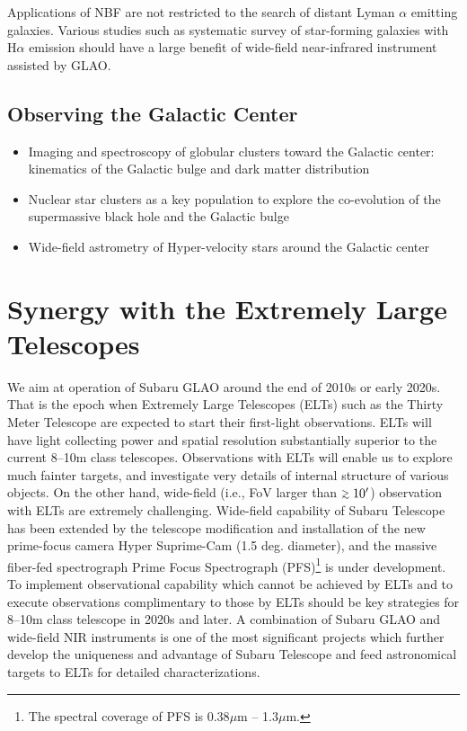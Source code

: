 Applications of NBF are not restricted to the search of distant Lyman
$\alpha$ emitting galaxies. Various studies such as systematic survey of
star-forming galaxies with H$\alpha$ emission should have a large
benefit of wide-field near-infrared instrument assisted by GLAO.


\subsection{Observing the Galactic Center}

\begin{itemize}
 \setlength{\itemsep}{-3pt}
 \item Imaging and spectroscopy of globular clusters toward the Galactic
       center: kinematics of the Galactic bulge and dark matter
       distribution
 \item Nuclear star clusters as a key population to explore the
       co-evolution of the supermassive black hole and the Galactic bulge
 \item Wide-field astrometry of Hyper-velocity stars around the Galactic
       center
\end{itemize}


\section{Synergy with the Extremely Large Telescopes}

We aim at operation of Subaru GLAO around the end of 2010s or early
2020s. That is the epoch when Extremely Large Telescopes (ELTs) such as
the Thirty Meter Telescope are expected to start their first-light
observations. ELTs will have light collecting power and spatial
resolution substantially superior to the current 8--10m class
telescopes. Observations with ELTs will enable us to explore much
fainter targets, and investigate very details of internal structure of
various objects. On the other hand, wide-field (i.e., FoV larger than
$\gsim10'$) observation with ELTs are extremely challenging. Wide-field
capability of Subaru Telescope has been extended by the telescope
modification and installation of the new prime-focus camera Hyper
Suprime-Cam (1.5 deg. diameter), and the massive fiber-fed spectrograph 
Prime Focus Spectrograph (PFS)\footnote{The spectral coverage of PFS is
0.38$\mu$m -- 1.3$\mu$m.} is under development.
To implement observational capability which cannot be achieved by ELTs
and to execute observations complimentary to those by ELTs should be key
strategies for 8--10m class telescope in 2020s and later. 
A combination of Subaru GLAO and wide-field NIR instruments is one
of the most significant projects which further develop the uniqueness
and advantage of Subaru Telescope and feed astronomical targets to ELTs
for detailed characterizations.

